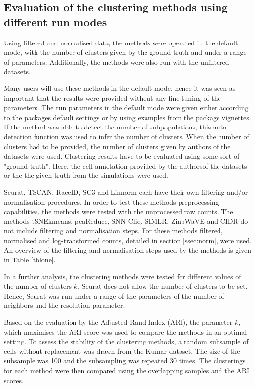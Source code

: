 \documentclass[12pt, a4paper]{article}\usepackage[]{graphicx}\usepackage[]{color}
\begin{document}
\subsection{Evaluation of the clustering methods using different run modes}
Using filtered and normalised data, the methods were operated in the default mode, with the number of clusters given by the ground truth and under a range of parameters. Additionally, the methods were also run with the unfiltered datasets. 

Many users will use these methods in the default mode, hence it was seen as important that the results were provided without any fine-tuning of the parameters.
The run parameters in the default mode were given either according to the packages default settings or by using examples from the package vignettes. If the method was able to detect the number of subpopulations, this auto-detection function was used to infer the number of clusters. When the number of clusters had to be provided, the number of clusters given by  authors of the datasets were used. Clustering results have to be evaluated using some sort of "ground truth". Here, the cell annotation provided by the authorsof the datasets or the the given truth from the simulations were used.

Seurat, TSCAN, RaceID, SC3 and Linnorm each have their own filtering and/or normalisation procedures. In order to test these methods preprocessing capabilities, the methods were tested with the unprocessed raw counts.
The methods tSNEkmeans, pcaReduce, SNN-Cliq, SIMLR, ZinbWaVE and CIDR do not include filtering and normalisation steps. For these methods filtered, normalised and log-transformed counts, detailed in section \ref{ssec:norm}, were used. An overview of the filtering and normalisation steps used by the methods is given in Table \ref{tblone}.

In a further analysis, the clustering methods were tested for different values of the number of clusters $k$. Seurat does not allow the number of clusters to be set. Hence, Seurat was run under a range of the parameters of the number of neighbors and the resolution parameter.

Based on the evaluation by the Adjusted Rand Index (ARI), the parameter $k$, which maximises the ARI score was used to compare the methods in an optimal setting. To assess the stability of the clustering methods, a random subsample of cells without replacement was drawn from the Kumar dataset. The size of the subsample was 100 and the subsampling was repeated 30 times. The clusterings for each method were then compared using the overlapping samples and the ARI scores.  
\end{document}
